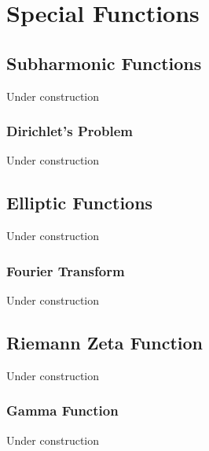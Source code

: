 \documentclass[oneside]{memoir}
\begin{document}


\chapter{Special Functions}
\label{cha:special_functions}

\section{Subharmonic Functions}
\label{sec:subharmonic_functions}

Under construction

\subsection{Dirichlet's Problem}
\label{sub:dirichlet_s_problem}

Under construction

\section{Elliptic Functions}
\label{sec:elliptic_functions}

Under construction

\subsection{Fourier Transform}
\label{sub:fourier_transform}
%

Under construction

\section{Riemann Zeta Function}
\label{sec:riemann_zeta_function}

Under construction

\subsection{Gamma Function}
\label{sub:gamma_function}

Under construction
\end{document}
